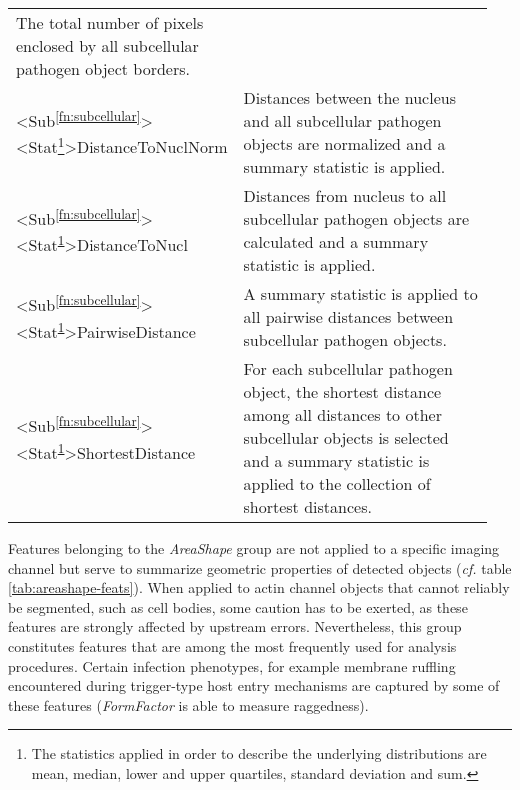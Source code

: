 \begin{table}
\begin{minipage}{\textwidth}
\begin{tabular}{L{0.25\linewidth}L{0.7\linewidth}}
      The total number of pixels enclosed by all subcellular pathogen object borders. \\
    <Sub\textsuperscript{\ref{fn:subcellular}}><Stat\footnote{\label{fn:statistics} The statistics applied in order to describe the underlying distributions are mean, median, lower and upper quartiles, standard deviation and sum.}>Distance\-ToNuclNorm &
      Distances between the nucleus and all subcellular pathogen objects are normalized and a summary statistic is applied. \\
    <Sub\textsuperscript{\ref{fn:subcellular}}><Stat\textsuperscript{\ref{fn:statistics}}>Distance\-ToNucl &
      Distances from nucleus to all subcellular pathogen objects are calculated and a summary statistic is applied.\\
    <Sub\textsuperscript{\ref{fn:subcellular}}><Stat\textsuperscript{\ref{fn:statistics}}>Pairwise\-Distance &
      A summary statistic is applied to all pairwise distances between subcellular pathogen objects. \\
    <Sub\textsuperscript{\ref{fn:subcellular}}><Stat\textsuperscript{\ref{fn:statistics}}>Shortest\-Distance &
      For each subcellular pathogen object, the shortest distance among all distances to other subcellular objects is selected and a summary statistic is applied to the collection of shortest distances. \\
  \end{tabular}
  \end{minipage}
\end{table}

Features belonging to the \textit{AreaShape} group are not applied to a specific imaging channel but serve to summarize geometric properties of detected objects (\textit{cf.} table \ref{tab:areashape-feats}). When applied to actin channel objects that cannot reliably be segmented, such as cell bodies, some caution has to be exerted, as these features are strongly affected by upstream errors. Nevertheless, this group constitutes features that are among the most frequently used for analysis procedures. Certain infection phenotypes, for example membrane ruffling encountered during trigger-type host entry mechanisms are captured by some of these features (\textit{FormFactor} is able to measure raggedness).


